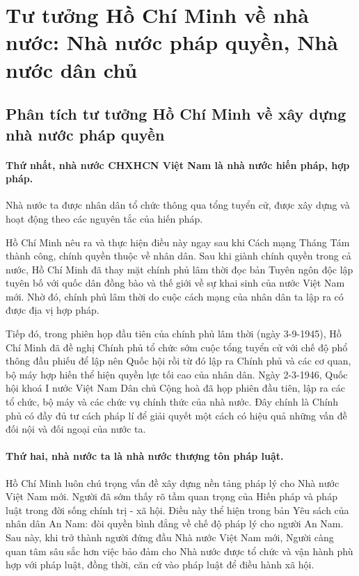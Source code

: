 \section{Tư tưởng Hồ Chí Minh về nhà nước: Nhà nước pháp quyền, Nhà nước dân chủ}

\subsection{Phân tích tư tưởng Hồ Chí Minh về xây dựng nhà nước pháp quyền}

\paragraph{Thứ nhất, nhà nước CHXHCN Việt Nam là nhà nước hiến pháp, hợp pháp.}
Nhà nước ta được nhân dân tổ chức thông qua tổng tuyển cử, được xây dựng và hoạt động theo các nguyên tắc của hiến pháp.

Hồ Chí Minh nêu ra và thực hiện điều này ngay sau khi Cách mạng Tháng Tám thành công, chính quyền thuộc về nhân dân. Sau khi giành chính quyền trong cả nước, Hồ Chí Minh đã thay mặt chính phủ lâm thời đọc bản Tuyên ngôn độc lập tuyên bố với quốc dân đồng bào và thế giới về sự khai sinh của nước Việt Nam mới. Nhờ đó, chính phủ lâm thời do cuộc cách mạng của nhân dân ta lập ra có được địa vị hợp pháp.

Tiếp đó, trong phiên họp đầu tiên của chính phủ lâm thời (ngày 3-9-1945), Hồ Chí Minh đã đề nghị Chính phủ tổ chức sớm cuộc tổng tuyển cử với chế độ phổ thông đầu phiếu để lập nên Quốc hội rồi từ đó lập ra Chính phủ và các cơ quan, bộ máy hợp hiến thể hiện quyền lực tối cao của nhân dân. Ngày 2-3-1946, Quốc hội khoá I nước Việt Nam Dân chủ Cộng hoà đã họp phiên đầu tiên, lập ra các tổ chức, bộ máy và các chức vụ chính thức của nhà nước. Đây chính là Chính phủ có đầy đủ tư cách pháp lí để giải quyết một cách có hiệu quả những vấn đề đối nội và đối ngoại của nước ta.

\paragraph{Thứ hai, nhà nước ta là nhà nước thượng tôn pháp luật.}
Hồ Chí Minh luôn chú trọng vấn đề xây dựng nền tảng pháp lý cho Nhà nước Việt Nam mới. Người đã sớm thấy rõ tầm quan trọng của Hiến pháp và pháp luật trong đời sống chính trị - xã hội. Điều này thể hiện trong bản Yêu sách của nhân dân An Nam: đòi quyền bình đẳng về chế độ pháp lý cho người An Nam. Sau này, khi trở thành người đứng đầu Nhà nước Việt Nam mới, Người càng quan tâm sâu sắc hơn việc bảo đảm cho Nhà nước được tổ chức và vận hành phù hợp với pháp luật, đồng thời, căn cứ vào pháp luật để điều hành xã hội.

